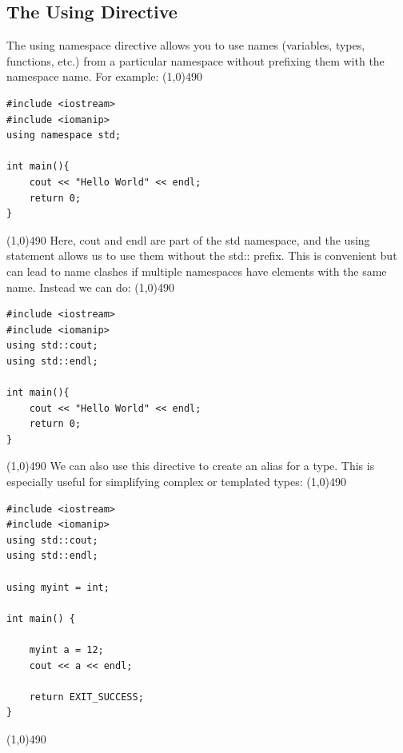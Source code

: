 \documentclass{report}
\begin{document}
    \pagebreak \bigbreak \noindent 
    \subsection{The Using Directive}
    \bigbreak \noindent 
    The using namespace directive allows you to use names (variables, types, functions, etc.) from a particular namespace without prefixing them with the namespace name. For example:
    \bigbreak \noindent 
    \line(1,0){490}
    \begin{verbatim}
#include <iostream>
#include <iomanip>
using namespace std;

int main(){
    cout << "Hello World" << endl;
    return 0;
}
    \end{verbatim}
    \line(1,0){490}
    \bigbreak \noindent 
    Here, cout and endl are part of the std namespace, and the using statement allows us to use them without the std:: prefix. This is convenient but can lead to name clashes if multiple namespaces have elements with the same name. Instead we can do:
    \bigbreak \noindent 
    \line(1,0){490}
    \begin{verbatim}
#include <iostream>
#include <iomanip>
using std::cout;
using std::endl;

int main(){
    cout << "Hello World" << endl;
    return 0;
}
    \end{verbatim}
    \line(1,0){490}
    \bigbreak \noindent 
    We can also use this directive to create an alias for a type. This is especially useful for simplifying complex or templated types:
    \bigbreak \noindent 
    \line(1,0){490}
    \begin{verbatim}
#include <iostream>
#include <iomanip>
using std::cout;
using std::endl;

using myint = int;

int main() {
    
    myint a = 12;
    cout << a << endl;

    return EXIT_SUCCESS;
}
    \end{verbatim}
    \line(1,0){490}

    \pagebreak \bigbreak \noindent 
\end{document}
